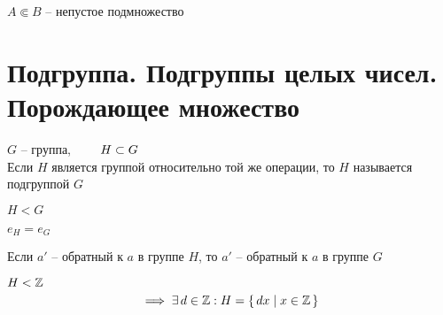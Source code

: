 \begin{notation}
	$ A \Subset B $ -- непустое подмножество
\end{notation}

\setcounter{section}{22}

\section{Подгруппа. Подгруппы целых чисел. Порождающее множество}

\begin{definition}
	$ G $ -- группа, $ \qquad H \subset G $ \\
	Если $ H $ является группой относительно той же операции, то $ H $ называется подгруппой $ G $
\end{definition}

\begin{notation}
	$ H < G $
\end{notation}

\begin{props}
	\item $ e_H = e_G $
	\item Если $ a' $ -- обратный к $ a $ в группе $ H $, то $ a' $ -- обратный к $ a $ в группе $ G $
\end{props}

\begin{theorem}
	$ H < \mathbb{Z} $
	$$ \implies \exists\, d \in \mathbb{Z} : H = \set{dx | x \in \ensuremath{\mathbb{Z}}} $$
\end{theorem}

